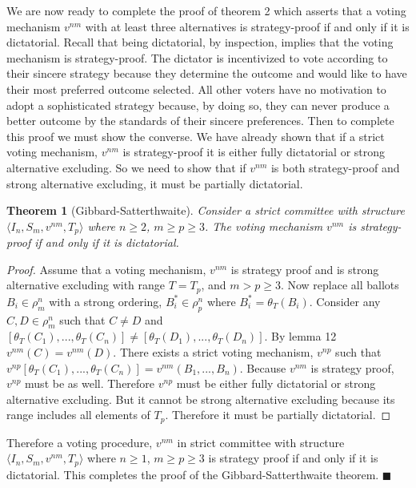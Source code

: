 \documentclass{amsart}
\newtheorem*{theorem*}{Theorem}
\theoremstyle{plain}
\begin{document}
We are now ready to complete the proof of theorem 2 which asserts that a voting mechanism $v^{nm}$ with at least three alternatives is strategy-proof if and only if it is dictatorial. Recall that being dictatorial, by inspection, implies that the voting mechanism is strategy-proof. The dictator is incentivized to vote according to their sincere strategy because they determine the outcome and would like to have their most preferred outcome selected. All other voters have no motivation to adopt a sophisticated strategy because, by doing so, they can never produce a better outcome by the standards of their sincere preferences. Then to complete this proof we must show the converse. We have already shown that if a strict voting mechanism, $v^{nm}$ is strategy-proof it is either fully dictatorial or strong alternative excluding. So we need to show that if $v^{nm}$ is both strategy-proof and strong alternative excluding, it must be partially dictatorial. 


 \begin{theorem*}[Gibbard-Satterthwaite]
     Consider a strict committee with structure $\langle I_n, S_m, v^{nm}, T_p \rangle$ where $n \ge 2$, $m \ge p \ge 3$. The voting mechanism $v^{nm}$ is strategy-proof if and only if it is dictatorial.
\end{theorem*}
\begin{proof}
    Assume that a voting mechanism, $v^{nm}$ is strategy proof and is strong alternative excluding with range $T = T_p$, and $m > p \ge 3$. Now replace all ballots $B_i \in \rho_m^n$ with a strong ordering, $B^*_i \in \rho_p^n$ where $B^*_i = \theta_T(B_i)$. Consider any $C,D \in \rho_m^n$ such that $C \ne D$ and $[\theta_T(C_1), ... , \theta_T(C_n)] \ne [\theta_T(D_1), ... , \theta_T(D_n)]$. By lemma 12 $v^{nm}(C) = v^{nm}(D)$. There exists a strict voting mechanism, $v^{np}$ such that $v^{np}[\theta_T(C_1), ... , \theta_T(C_n)] = v^{nm}(B_1, ... , B_n)$. Because $v^{nm}$ is strategy proof, $v^{np}$ must be as well. Therefore $v^{np}$ must be either fully dictatorial or strong alternative excluding. But it cannot be strong alternative excluding because its range includes all elements of $T_p$. Therefore it must be partially dictatorial.
\end{proof}

Therefore a voting procedure, $v^{nm}$ in strict committee with structure $\langle I_n, S_m, v^{nm}, T_p \rangle$ where $n \ge 1$, $m \ge p \ge 3$ is strategy proof if and only if it is dictatorial. This completes the proof of the Gibbard-Satterthwaite theorem. $\blacksquare$
\end{document}
